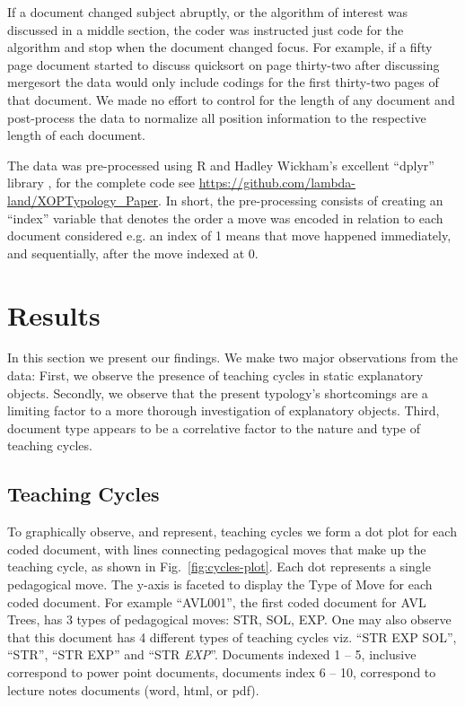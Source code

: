 \documentclass[conference]{IEEEtran}
\begin{document}
If a document changed subject abruptly, or the algorithm of interest was
discussed in a middle section, the coder was instructed just code for the
algorithm and stop when the document changed focus. For
example, if a fifty page document started to discuss quicksort on page
thirty-two after discussing mergesort the data would only include codings for
the first thirty-two pages of that document. We made no effort to control for
the length of any document and post-process the data to normalize all position
information to the respective length of each document.

The data was pre-processed using R and Hadley Wickham's excellent ``dplyr''
library \cite{Dplyr}, for the complete code see
\url{https://github.com/lambda-land/XOPTypology_Paper}. In short, the
pre-processing consists of creating an ``index'' variable that denotes the order
a move was encoded in relation to each document considered e.g. an index of 1
means that move happened immediately, and sequentially, after the move indexed
at 0.

\section{Results}
In this section we present our findings. We make two major observations from the data: First,
we observe the presence of teaching cycles in static explanatory objects.
Secondly, we observe that the present typology's shortcomings are a limiting
factor to a more thorough investigation of explanatory objects. Third,
document type appears to be a correlative factor to the nature and type of
teaching cycles.


\subsection{Teaching Cycles}

To graphically observe, and represent, teaching cycles we form a dot plot for
each coded document, with lines connecting pedagogical moves that make up the
teaching cycle, as shown in Fig.~\ref{fig:cycles-plot}.
%
Each dot represents a single pedagogical move. The y-axis is faceted to display
the Type of Move for each coded document. For example ``AVL001'', the first
coded document for AVL Trees, has 3 types of pedagogical moves: STR, SOL, EXP.
One may also observe that this document has 4 different types of teaching cycles
viz. ``STR EXP SOL'', ``STR'', ``STR EXP'' and ``STR \emph{EXP}''. Documents
indexed 1 -- 5, inclusive correspond to power point documents, documents index 6
-- 10, correspond to lecture notes documents (word, html, or pdf).
\end{document}
